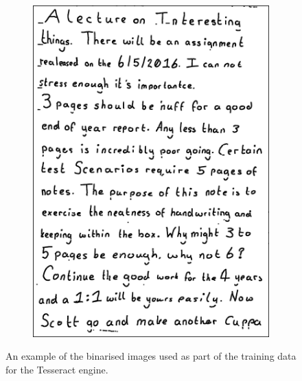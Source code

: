 \begin{figure}[H]
  \begin{subfigure}[h]{0.35\textwidth}
    \includegraphics[scale=0.3]{images/training_data_2}
    \caption{}
    \label{fig:second_tesseract}
  \end{subfigure}

  \caption{An example of the binarised images used as part of the training data for the Tesseract engine.}
  \label{fig:tesseract_training data}

\end{figure}

